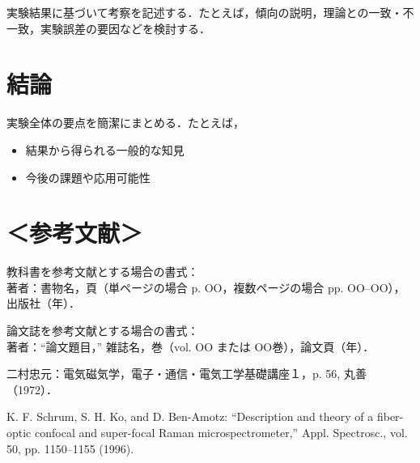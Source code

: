\documentclass[lualatex,ja=standard]{bxjsarticle}
\begin{document}
実験結果に基づいて考察を記述する．たとえば，傾向の説明，理論との一致・不一致，実験誤差の要因などを検討する．

\section{結論}

実験全体の要点を簡潔にまとめる．たとえば，

\begin{itemize}
  \item 結果から得られる一般的な知見
  \item 今後の課題や応用可能性
\end{itemize}

\section*{＜参考文献＞}

\begin{enumerate}[label={[\arabic*]}]
  \item 教科書を参考文献とする場合の書式：\\
  著者：書物名，頁（単ページの場合 p. OO，複数ページの場合 pp. OO--OO），出版社（年）．

  \item 論文誌を参考文献とする場合の書式：\\
  著者：“論文題目，” 雑誌名，巻（vol. OO または OO巻），論文頁（年）．

  \item 二村忠元：電気磁気学，電子・通信・電気工学基礎講座１，p. 56, 丸善（1972）．

  \item K. F. Schrum, S. H. Ko, and D. Ben-Amotz: “Description and theory of a fiber-optic confocal and super-focal Raman microspectrometer,” Appl. Spectrosc., vol. 50, pp. 1150–1155 (1996).
\end{enumerate}
\end{document}
